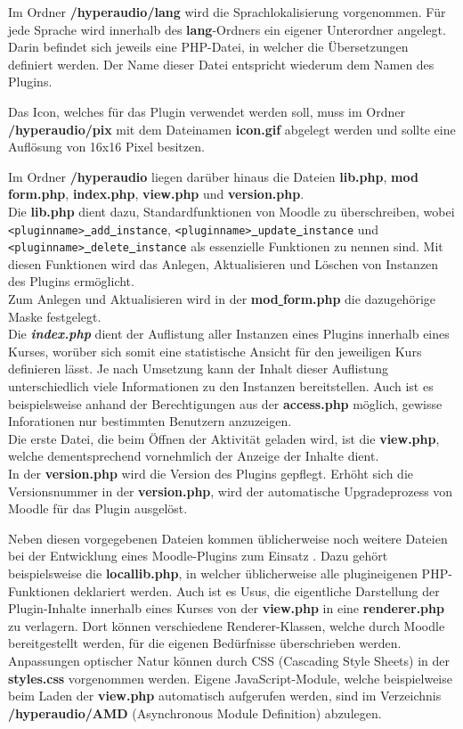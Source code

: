 Im Ordner \textbf{/hyperaudio/lang} wird die Sprachlokalisierung vorgenommen. Für jede Sprache wird innerhalb des \textbf{lang}-Ordners ein eigener Unterordner angelegt. Darin befindet sich jeweils eine PHP-Datei, in welcher die Übersetzungen definiert werden. Der Name dieser Datei entspricht wiederum dem Namen des Plugins.

Das Icon, welches für das Plugin  verwendet werden soll, muss im Ordner \textbf{/hyperaudio/pix} mit dem Dateinamen \textbf{icon.gif} abgelegt werden und sollte eine Auflösung von 16x16 Pixel besitzen.

Im Ordner \textbf{/hyperaudio} liegen darüber hinaus die Dateien \textbf{lib.php}, \textbf{mod\underline{{ }}form.php}, \textbf{index.php}, \textbf{view.php} und \textbf{version.php}.\\
Die \textbf{lib.php} dient dazu, Standardfunktionen von Moodle zu überschreiben, wobei \texttt{<pluginname>\underline{{ }}add\underline{{ }}instance}, \texttt{<pluginname>\underline{{ }}update\underline{{ }}instance} und \texttt{<pluginname>\underline{{ }}delete\underline{{ }}instance} als essenzielle Funktionen zu nennen sind. Mit diesen Funktionen wird das Anlegen, Aktualisieren und Löschen von Instanzen des Plugins ermöglicht.\\
Zum Anlegen und Aktualisieren wird in der \textbf{mod\underline{{ }}form.php} die dazugehörige Maske festgelegt.\\
Die \textbf{\textit{index.php}} dient der Auflistung aller Instanzen eines Plugins innerhalb eines Kurses, worüber sich somit eine statistische Ansicht für den jeweiligen Kurs definieren lässt. Je nach Umsetzung kann der Inhalt dieser Auflistung unterschiedlich viele Informationen zu den Instanzen bereitstellen. Auch ist es beispielsweise anhand der Berechtigungen aus der \textbf{access.php} möglich, gewisse Inforationen nur bestimmten Benutzern anzuzeigen.\\
Die erste Datei, die beim Öffnen der Aktivität geladen wird, ist die \textbf{view.php}, welche dementsprechend vornehmlich der Anzeige der Inhalte dient.\\
In der \textbf{version.php} wird die Version des Plugins gepflegt. Erhöht sich die Versionsnummer in der \textbf{version.php}, wird der automatische Upgradeprozess von Moodle für das Plugin ausgelöst.

Neben diesen vorgegebenen Dateien kommen üblicherweise noch weitere Dateien bei der Entwicklung eines Moodle-Plugins zum Einsatz \citep{wild2017moodle}. Dazu gehört beispielsweise die \textbf{locallib.php}, in welcher üblicherweise alle plugineigenen PHP-Funktionen deklariert werden. Auch ist es Usus, die eigentliche Darstellung der Plugin-Inhalte innerhalb eines Kurses von der \textbf{view.php} in eine \textbf{renderer.php} zu verlagern. Dort können verschiedene Renderer-Klassen, welche durch Moodle bereitgestellt werden, für die eigenen Bedürfnisse überschrieben werden. Anpassungen optischer Natur können durch CSS (Cascading Style Sheets) in der \textbf{styles.css} vorgenommen werden. Eigene JavaScript-Module, welche beispielweise beim Laden der \textbf{view.php} automatisch aufgerufen werden, sind im Verzeichnis \textbf{/hyperaudio/AMD} (Asynchronous Module Definition) abzulegen.

